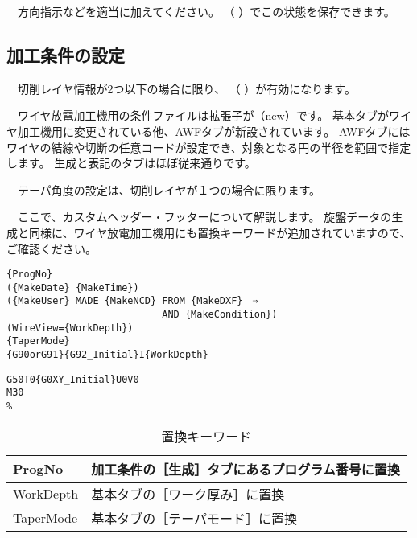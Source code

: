 　方向指示などを適当に加えてください。
（\,\,）でこの状態を保存できます。

\subsection{加工条件の設定}
　切削レイヤ情報が2つ以下の場合に限り、
（\,\,）が有効になります。

\begin{minipage}[t]{0.4\textwidth}
　ワイヤ放電加工機用の条件ファイルは拡張子が（ncw）です。
基本タブがワイヤ加工機用に変更されている他、AWFタブが新設されています。
AWFタブにはワイヤの結線や切断の任意コードが設定でき、対象となる円の半径を範囲で指定します。
生成と表記のタブはほぼ従来通りです。

　テーパ角度の設定は、切削レイヤが１つの場合に限ります。
\end{minipage}
\begin{minipage}[t]{0.6\textwidth}
\end{minipage}

\vspace*{1zh}
　ここで、カスタムヘッダー・フッターについて解説します。
旋盤データの生成と同様に、ワイヤ放電加工機用にも置換キーワードが追加されていますので、ご確認ください。

\begin{minipage}[t]{0.6\textwidth}
\begin{lstlisting}[caption=Header.txt,numbers=none,label=lst:header.txt]
%
{ProgNo}
({MakeDate} {MakeTime})
({MakeUser} MADE {MakeNCD} FROM {MakeDXF}　⇒
                           AND {MakeCondition})
(WireView={WorkDepth})
{TaperMode}
{G90orG91}{G92_Initial}I{WorkDepth}
\end{lstlisting}
\end{minipage}
\begin{minipage}[t]{0.4\textwidth}
\begin{lstlisting}[caption=Footer.txt,numbers=none,label=lst:footer.txt]
G50T0{G0XY_Initial}U0V0
M30
%
\end{lstlisting}
\end{minipage}

\begin{table}[H]
\centering
\caption{置換キーワード}
\label{tab:keyword}
\begin{tabular}{|p{3cm}|p{10cm}|}
\hline
ProgNo & 加工条件の［生成］タブにあるプログラム番号に置換 \\ \hline
WorkDepth & 基本タブの［ワーク厚み］に置換 \\
TaperMode & 基本タブの［テーパモード］に置換 \\ \hline
\end{tabular}
\end{table}

